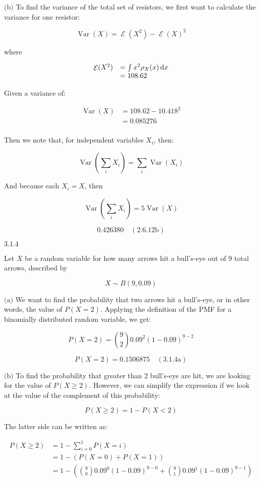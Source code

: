 \documentclass{article}
\newcommand{\problem}[2]{$\boxed{\text{#1.#2}}$}
\newcommand{\subproblem}[3]{$\boxed{\text{(#3)}}$}
\newcommand{\subsolution}[4]{\boxed{#4\quad(\text{#1.#2#3})}}
\renewcommand{\d}[1]{\,\textnormal{d}#1}
\DeclareMathOperator{\var}{Var}
\DeclareMathOperator{\E}{\mathcal{E}}
\begin{document}
%
\subproblem{2.6}{12}{b} To find the variance of the total set of
resistors, we first want to calculate the variance for one resistor:

\[
\var(X)=\E(X^2)-\E(X)^2
\]

where

\[
\begin{array}{rl}
\E(X^2) &=\int x^2 \rho_X(x)\d{x} \\
&=108.62 \\
\end{array}
\]

Given a variance of:

\[
\begin{array}{rl}
\var(X)&=108.62 - 10.418^2 \\
&=0.085276 \\
\end{array}
\]

Then we note that, for independent variables $X_i$, then:

\[
\var\left(\sum\limits_i X_i\right) = \sum\limits_i \var(X_i)
\]

And because each $X_i=X$, then

\[
\var\left(\sum\limits_i X_i\right)=5\var(X)
\]

\[
\subsolution{2.6}{12}{b}{0.426380}
\]

%
\problem{3.1}{4}

Let $X$ be a random variable for how many arrows hit a bull's-eye out
of 9 total arrows, described by

\[
X\sim B(9, 0.09)
\]

%
\subproblem{3.1}{4}{a} We want to find the probability that two arrows
hit a bull's-eye, or in other words, the value of $P(X=2)$. Applying
the definition of the PMF for a binomially distributed random
variable, we get:

\[
P(X=2)=\binom{9}{2} 0.09^2(1-0.09)^{9-2}
\]

\[
\subsolution{3.1}{4}{a}{P(X=2)=0.1506875}
\]

%
\subproblem{3.1}{4}{b} To find the probability that greater than 2
bull's-eye are hit, we are looking for the value of
$P(X\ge2)$. However, we can simplify the expression if we look at the
value of the complement of this probability:

\[
P(X\ge2) = 1 - P(X<2)
\]

The latter side can be written as:

\[
\begin{array}{rl}
P(X\ge2) &= 1 - \sum\limits_{i=0}^1 P(X=i) \\
&= 1 - \left(P(X=0)+P(X=1)\right) \\
&= 1 - \left(\binom{9}{0} 0.09^0 (1-0.09)^{9-0} + \binom{9}{1} 0.09^1 (1-0.09)^{9-1}\right) \\
\end{array}
\]
\end{document}
